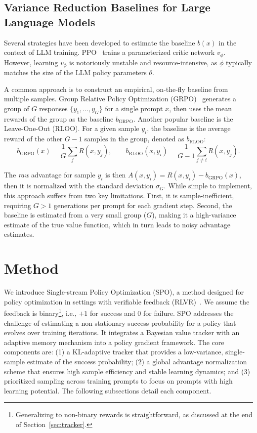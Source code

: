 \subsection{Variance Reduction Baselines for Large Language Models}
Several strategies have been developed to estimate the baseline $b(x)$ in the context of LLM training. PPO~\cite{PPO} trains a parameterized critic network $v_\phi$. However, learning $v_\phi$ is notoriously unstable and resource-intensive, as $\phi$ typically matches the size of the LLM policy parameters $\theta$.

A common approach is to construct an empirical, on-the-fly baseline from multiple samples. Group Relative Policy Optimization (GRPO)~\cite{GRPO,R1} generates a group of $G$ responses $\{y_1, \dots, y_G\}$ for a single prompt $x$, then uses the mean rewards of the group as the baseline $b_\text{GRPO}$. Another popular baseline is the Leave-One-Out (RLOO). For a given sample $y_i$, the baseline is the average reward of the other $G-1$ samples in the group, denoted as $b_\text{RLOO}$:
\begin{equation}
        b_{\text{GRPO}}(x) = \frac{1}{G} \sum_{j} R(x, y_j),  \qquad
    b_{\text{RLOO}}(x,y_i) = \frac{1}{G-1} \sum_{j \neq i} R(x, y_j).
\end{equation}

The \emph{raw} advantage for sample $y_i$ is then $A(x, y_i) = R(x,y_i) - b_{\text{GRPO}}(x)$, then it is normalized with the standard deviation $\sigma_G$. While simple to implement, this approach suffers from two key limitations. First, it is sample-inefficient, requiring $G>1$ generations per prompt for each gradient step. Second, the baseline is estimated from a very small group ($G$), making it a high-variance estimate of the true value function, which in turn leads to noisy advantage estimates.


\section{Method}

We introduce Single-stream Policy Optimization (SPO), a method designed for policy optimization in settings with verifiable feedback (RLVR)~\cite{RLVR}. We assume the feedback is binary\footnote{Generalizing to non-binary rewards is straightforward, as discussed at the end of Section~\ref{sec:tracker}.}, i.e., $+1$ for success and $0$ for failure. SPO addresses the challenge of estimating a non-stationary success probability for a policy that evolves over training iterations. It integrates a Bayesian value tracker with an adaptive memory mechanism into a policy gradient framework. The core components are: (1) a KL-adaptive tracker that provides a low-variance, single-sample estimate of the success probability; (2) a global advantage normalization scheme that ensures high sample efficiency and stable learning dynamics; and (3) prioritized sampling across training prompts to focus on prompts with high learning potential. The following subsections detail each component.

